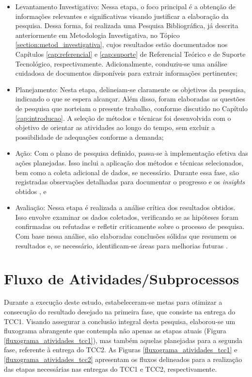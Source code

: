 \begin{itemize}
    \item Levantamento Investigativo: Nessa etapa, o foco principal é a obtenção de informações relevantes e 
    significativas visando justificar a elaboração da pesquisa. Dessa forma, foi realizada uma Pesquisa Bibliográfica, 
    já descrita anteriormente em Metodologia Investigativa, no Tópico \ref{section:metod_investigativa}, cujos resultados estão documentados nos 
    Capítulos \ref{cap:referencial} e \ref{cap:suporte} de Referencial Teórico e de Suporte Tecnológico, respectivamente. 
    Adicionalmente, conduziu-se uma análise cuidadosa de documentos disponíveis para extrair informações pertinentes;

    \item Planejamento: Nesta etapa, delineiam-se claramente os objetivos da pesquisa, indicando o que se espera alcançar. 
    Além disso, foram elaboradas as questões de pesquisa que norteiam o presente trabalho, conforme discutido no Capítulo 
    \ref{cap:introducao}. A seleção de métodos e técnicas foi desenvolvida com o objetivo de orientar as atividades ao longo 
    do tempo, sem excluir a possibilidade de adequações conforme a demanda; 

    \item Ação: Com o plano de pesquisa definido, passa-se à implementação efetiva das ações planejadas. Isso inclui a aplicação dos 
    métodos e técnicas selecionados, bem como a coleta adicional de dados, se necessário. Durante essa fase, são registradas observações 
    detalhadas para documentar o progresso e os \textit{insights} obtidos \cite{krafta2007metodo}, e
    
    \item Avaliação: Nessa etapa é realizada a análise crítica dos resultados obtidos. Isso envolve examinar os dados coletados, 
    verificando se as hipóteses foram confirmadas ou refutadas e refletir criticamente sobre o processo de pesquisa. Com base nessa 
    análise, são elaboradas conclusões sólidas que resumem os resultados e, se necessário, identificam-se áreas para melhorias 
    futuras \cite{furtado2008avaliaccao}.
\end{itemize}

\section{Fluxo de Atividades/Subprocessos}
\label{section:fluxo_atividades}

Durante a execução deste estudo, estabeleceram-se metas para otimizar a consecução do resultado desejado na primeira fase, que consiste 
na entrega do TCC1. Visando assegurar a conclusão integral desta pesquisa, elaborou-se um fluxograma abrangente que contempla não apenas 
as etapas atuais (Figura \ref{fluxograma_atividades_tcc1}), mas também aquelas planejadas para a segunda fase, referente à entrega do TCC2. 
As Figuras \ref{fluxograma_atividades_tcc1} e \ref{fluxograma_atividades_tcc2} apresentam os fluxos delineados para a realização das 
etapas necessárias nas entregas do TCC1 e TCC2, respectivamente.

